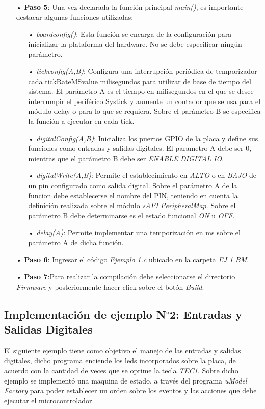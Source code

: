 \documentclass[12pt,letterpaper]{article}
\begin{document}
\begin{enumerate}
\item[•]\textbf{Paso 5}: Una vez declarada la función principal \textit{main()}, es importante destacar algunas funciones utilizadas:
\begin{enumerate}
\item[•]\textit{boardconfig()}: Esta función se encarga de la configuración para inicializar la plataforma del hardware. No se debe especificar ningún parámetro.
\item[•]\textit{tickconfig(A,B)}: Configura una interrupción periódica de temporizador cada tickRateMSvalue milisegundos para utilizar de base de tiempo del sistema. El parámetro A es el tiempo en milisegundos en el que se desee interrumpir el periférico Systick y aumente un contador que se usa para el módulo delay o para lo que se requiera. Sobre el parámetro B se especifica la función a ejecutar en cada tick.
\item[•]\textit{digitalConfig(A,B)}: Inicializa los puertos GPIO de la placa y define sus funciones como entradas y salidas digitales. El parametro A debe ser 0, mientras que el parámetro B debe ser \textit{ENABLE$\_$DIGITAL$\_$IO}.
\item[•]\textit{digitalWrite(A,B)}: Permite el establecimiento en \textit{ALTO} o en \textit{BAJO} de un pin configurado como salida digital. Sobre el parámetro A de la funcion debe establecerse el nombre del PIN, teniendo en cuenta la definición realizada sobre el módulo \textit{sAPI$\_$PeripheralMap}. Sobre el parámetro B debe determinarse es el estado funcional \textit{ON} u \textit{OFF}.
\item[•]\textit{delay(A)}: Permite implementar una temporización en ms sobre el parámetro A de dicha función.
\end{enumerate}
\item[•]\textbf{Paso 6}: Ingresar el código \textit{Ejemplo$\_$1.c} ubicado en la carpeta \textit{EJ$\_$1$\_$BM}. 
\item[•]\textbf{Paso 7}:Para realizar la compilación debe seleccionarse el directorio \textit{Firmware} y posteriormente hacer click sobre el botón \textit{Build}.
\end{enumerate}
\subsection{Implementación de ejemplo N$^{\circ}$2: Entradas y Salidas Digitales}\label{sec:ej2sapi}

El siguiente ejemplo tiene como objetivo el manejo de las entradas y salidas digitales, dicho programa enciende los leds incorporados sobre la placa, de acuerdo con la cantidad de veces que se oprime la tecla \textit{TEC1}. Sobre dicho ejemplo se implementó una maquina de estado, a través del programa \textit{uModel Factory} para poder establecer un orden sobre los eventos y las acciones que debe ejecutar el microcontrolador.
 \\
 
\end{document}
